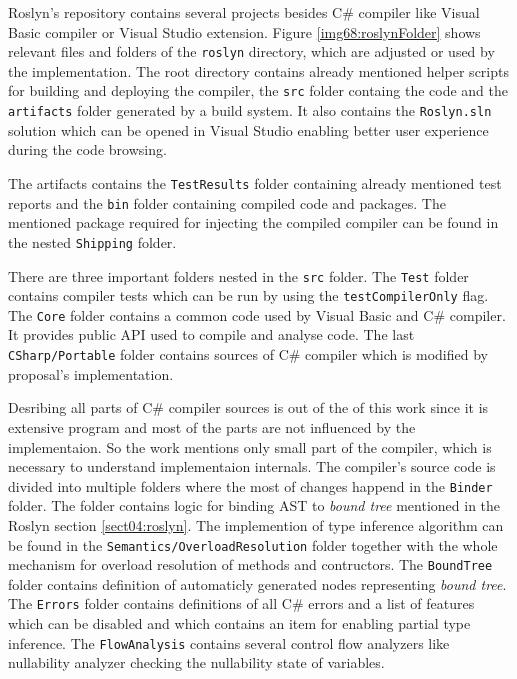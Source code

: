 Roslyn's repository contains several projects besides C\# compiler like Visual Basic compiler or Visual Studio extension.
Figure \ref{img68:roslynFolder} shows relevant files and folders of the \texttt{roslyn} directory, which are adjusted or used by the implementation.
The root directory contains already mentioned helper scripts for building and deploying the compiler, the \texttt{src} folder containg the code and the \texttt{artifacts} folder generated by a build system.
It also contains the \texttt{Roslyn.sln} solution which can be opened in Visual Studio enabling better user experience during the code browsing.
\par
The artifacts contains the \texttt{TestResults} folder containing already mentioned test reports and the \texttt{bin} folder containing compiled code and packages.
The mentioned package required for injecting the compiled compiler can be found in the nested \texttt{Shipping} folder.
\par
There are three important folders nested in the \texttt{src} folder.
The \texttt{Test} folder contains compiler tests which can be run by using the \texttt{testCompilerOnly} flag.
The \texttt{Core} folder contains a common code used by Visual Basic and C\# compiler.
It provides public API used to compile and analyse code.
The last \texttt{CSharp/Portable} folder contains sources of C\# compiler which is modified by proposal's implementation.
\par
Desribing all parts of C\# compiler sources is out of the of this work since it is extensive program and most of the parts are not influenced by the implementaion.
So the work mentions only small part of the compiler, which is necessary to understand implementaion internals.
The compiler's source code is divided into multiple folders where the most of changes happend in the \texttt{Binder} folder.
The folder contains logic for binding \ac{AST} to \textit{bound tree} mentioned in the Roslyn section \ref{sect04:roslyn}.
The implemention of type inference algorithm can be found in the \texttt{Semantics/OverloadResolution} folder together with the whole mechanism for overload resolution of methods and contructors.
The \texttt{BoundTree} folder contains definition of automaticly generated nodes representing \textit{bound tree}.
The \texttt{Errors} folder contains definitions of all C\# errors and a list of features which can be disabled and which contains an item for enabling partial type inference.
The \texttt{FlowAnalysis} contains several control flow analyzers like nullability analyzer checking the nullability state of variables.
